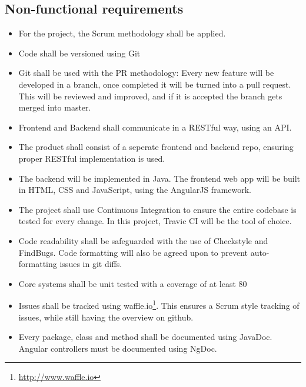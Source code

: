 \subsection{Non-functional requirements}
\begin{itemize}

\item For the project, the Scrum methodology shall be applied.

\item Code shall be versioned using Git

\item Git shall be used with the PR methodology: Every new feature will be developed in a branch, once completed it will be turned into a pull request. This will be reviewed and improved, and if it is accepted the branch gets merged into master.

\item Frontend and Backend shall communicate in a RESTful way, using an API.

\item The product shall consist of a seperate frontend and backend repo, ensuring proper RESTful implementation is used.

\item The backend will be implemented in Java. The frontend web app will be built in HTML, CSS and JavaScript, using the AngularJS framework. 

\item The project shall use Continuous Integration to ensure the entire codebase is tested for every change. In this project, Travic CI will be the tool of choice.

\item Code readability shall be safeguarded with the use of Checkstyle and FindBugs. Code formatting will also be agreed upon to prevent auto-formatting issues in git diffs.

\item Core systems shall be unit tested with a coverage of at least 80%

\item Issues shall be tracked using waffle.io\footnote{\url{http://www.waffle.io}}. This ensures a Scrum style tracking of issues, while still having the overview on github.

\item Every package, class and method shall be documented using JavaDoc. Angular controllers must be documented using NgDoc. 

\end{itemize}
